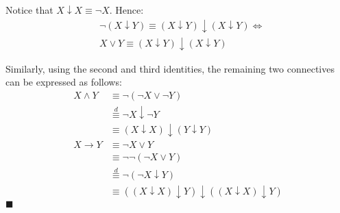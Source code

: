 \documentclass[12pt]{article}
\newcommand{\q}{\hfill $\blacksquare$}
\newenvironment{ps}
{\begin{enumerate}[leftmargin=0em, itemindent=1.5em]}
{\end{enumerate}}
\begin{document}
\begin{ps}
        Notice that \( X \downarrow X \equiv \neg X \). Hence: 
        \begin{align*}
            &\neg (X \downarrow Y) \equiv (X \downarrow Y) \downarrow (X \downarrow Y) \Leftrightarrow \\
            &X \vee Y \equiv (X \downarrow Y) \downarrow (X \downarrow Y)
        \end{align*}

        Similarly, using the second and third identities, the remaining two connectives can be
        expressed as follows: 
        \begin{align*}
            X \wedge Y &\equiv \neg (\neg X \vee \neg Y) \\
                     &\overset{d}{\equiv} \neg X \downarrow \neg Y \\
                     &\equiv (X \downarrow X) \downarrow (Y \downarrow Y) \\
            X \rightarrow Y &\equiv \neg X \vee Y \\
                            &\equiv \neg \neg (\neg X \vee Y) \\
                            &\overset{d}{\equiv} \neg (\neg X \downarrow Y)\\
                            &\equiv ((X \downarrow X) \downarrow Y) \downarrow ((X \downarrow X)
                            \downarrow Y)
        \end{align*} \q

\end{ps}
\end{document}
